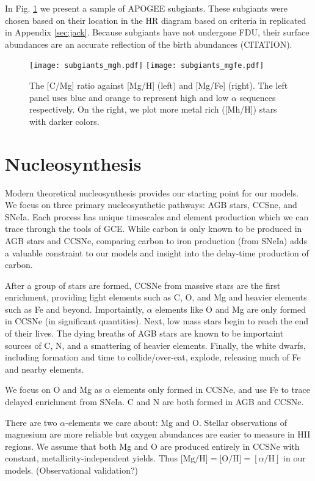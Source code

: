 \documentclass[12pt,oneside]{book}
\begin{document}
In Fig. \ref{fig:subgiants} we present a sample of APOGEE subgiants. These subgiants were chosen based on their location in the HR diagram based on criteria in \citet{jack_subgiant} replicated in Appendix \ref{sec:jack}. Because subgiants have not undergone FDU, their surface abundances are an accurate reflection of the birth abundances (CITATION).  




\begin{figure}[htp]
    \centering
    \texttt{[image: subgiants\_mgh.pdf]}
    \texttt{[image: subgiants\_mgfe.pdf]}
    \caption[APOGEE Subgiants]{The [C/Mg] ratio against [Mg/H] (left) and [Mg/Fe] (right). The left panel uses blue and orange to represent high and low $\alpha$ sequences respectively. On the right, we plot more metal rich ([Mh/H]) stars with darker colors.}
    \label{fig:subgiants}
\end{figure}
\chapter{Nucleosynthesis}

Modern theoretical nucleosynthesis provides our starting point for our models.  We focus on three primary nucleosynthetic pathways: AGB stars, CCSne, and SNeIa. Each process has unique timescales and element production which we can trace through the tools of GCE. While carbon is only known to be produced in AGB stars and CCSNe, comparing carbon to iron production (from SNeIa) adds a valuable constraint to our models and insight into the delay-time production of carbon.

After a group of stars are formed, CCSNe from massive stars are the first enrichment, providing light elements such as C, O, and Mg and heavier elements such as Fe and beyond. Importaintly, $\alpha$ elements like O and Mg are only formed in CCSNe (in significant quantities). Next, low mass stars begin to reach the end of their lives. The dying breaths of AGB stars are known to be importaint sources of C, N, and a smattering of heavier elements.  Finally, the white dwarfs, including formation and time to collide/over-eat, explode, releasing much of Fe and nearby elements. 

We focus on O and Mg as $\alpha$ elements only formed in CCSNe, and use Fe to
trace delayed enrichment from SNeIa. C and N are both formed in AGB and CCSNe.

There are two $\alpha$-elements we care about: Mg and O. Stellar observations
of magnesium are more reliable but oxygen abundances are easier to measure in
HII regions. We assume that both Mg and O are produced entirely in CCSNe with
constant, metallicity-independent yields. Thus $\text{[Mg/H]} = \text{[O/H]} =
[\alpha/\text{H}]$ in our models. (Observational validation?)
\end{document}
